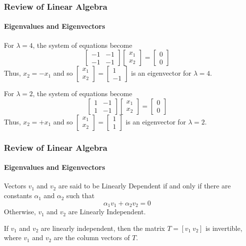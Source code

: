 \begin{frame}
\frametitle{Review of Linear Algebra}
\framesubtitle{Eigenvalues and Eigenvectors}
\begin{examp}
For $\lambda = 4$, the system of equations become
$$
\left[\begin{array}{rr}
-1 & -1 \\ -1 & -1
\end{array}\right] \left[\begin{array}{c}
x_1 \\ x_2
\end{array}\right] = \left[\begin{array}{c}
0 \\ 0
\end{array}\right]
$$
Thus, $x_2 = -x_1$ and so $\left[\begin{array}{c}
x_1 \\ x_2
\end{array}\right] = \left[\begin{array}{r}
1 \\ -1
\end{array}\right]$ is an eigenvector for $\lambda = 4$.

For $\lambda = 2$, the system of equations become
$$
\left[\begin{array}{rr}
1 & -1 \\ 1 & -1
\end{array}\right] \left[\begin{array}{c}
x_1 \\ x_2
\end{array}\right] = \left[\begin{array}{c}
0 \\ 0
\end{array}\right]
$$
Thus, $x_2 = +x_1$ and so $\left[\begin{array}{c}
x_1 \\ x_2
\end{array}\right] = \left[\begin{array}{c}
1 \\ 1
\end{array}\right]$ is an eigenvector for $\lambda = 2$.
\end{examp}
\end{frame}
\begin{frame}
\frametitle{Review of Linear Algebra}
\framesubtitle{Eigenvalues and Eigenvectors}
\begin{definition}
Vectors $v_1$ and $v_2$ are said to be {\bor Linearly Dependent} if and only if there
are constants $\alpha_1$ and $\alpha_2$ such that
$$
\alpha_1 v_1 + \alpha_2 v_2 = 0
$$
Otherwise, $v_1$ and $v_2$ are {\bor Linearly Independent}.
\end{definition}
If $v_1$ and $v_2$ are linearly independent, then the matrix $T = [v_1 \ v_2]$ is
invertible, where $v_1$ and $v_2$ are the column vectors of $T$.
\end{frame}
